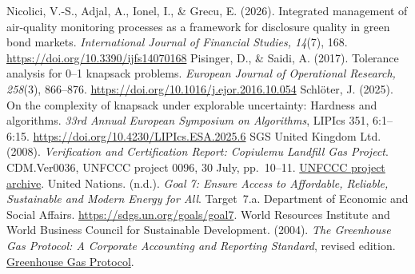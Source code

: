 \begin{thebibliography}{}
 Nicolici, V.-S., Adjal, A., Ionel, I., \& Grecu, E. (2026). Integrated management of air-quality monitoring processes as a framework for disclosure quality in green bond markets. \emph{International Journal of Financial Studies, 14}(7), 168. \url{https://doi.org/10.3390/ijfs14070168}
 Pisinger, D., \& Saidi, A. (2017). Tolerance analysis for 0--1 knapsack problems. \emph{European Journal of Operational Research, 258}(3), 866--876. \url{https://doi.org/10.1016/j.ejor.2016.10.054}
 Schlöter, J. (2025). On the complexity of knapsack under explorable uncertainty: Hardness and algorithms. \emph{33rd Annual European Symposium on Algorithms}, LIPIcs 351, 6:1--6:15. \url{https://doi.org/10.4230/LIPIcs.ESA.2025.6}
 SGS United Kingdom Ltd. (2008). \emph{Verification and Certification Report: Copiulemu Landfill Gas Project}. CDM.Ver0036, UNFCCC project 0096, 30 July, pp.~10--11. \href{https://cdm.unfccc.int/Projects/DB/DNV-CUK1126875537.72/iProcess/SGS-UKL1188294574.74/ReviewInitialComments/NEXNYPXPNJFC9OOG8BF6DBO3EOC9Q4}{UNFCCC project archive}.
 United Nations. (n.d.). \emph{Goal 7: Ensure Access to Affordable, Reliable, Sustainable and Modern Energy for All}. Target~7.a. Department of Economic and Social Affairs. \url{https://sdgs.un.org/goals/goal7}.
 World Resources Institute and World Business Council for Sustainable Development. (2004). \emph{The Greenhouse Gas Protocol: A Corporate Accounting and Reporting Standard}, revised edition. \href{https://ghgprotocol.org/sites/default/files/standards/ghg-protocol-revised.pdf}{Greenhouse Gas Protocol}.
\end{thebibliography}
